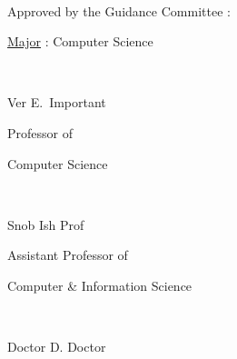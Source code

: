 \thispagestyle{plain}
\mbox{} \\
{\large
Approved by the Guidance Committee :

\vspace{.2 in}

\hspace{.2 in} \underline{Major} : Computer Science

\vspace{.2 in plus 1fill}

\hspace{3.2 in} \hrulefill\

\vspace{-.2 in}

\hspace{3.2 in} Ver E.\ Important
\vspace{-.1 in}

\hspace{3.2 in} Professor of

\vspace{-.2 in}

\hspace{3.2 in} Computer Science

\vspace{.2 in plus 1fill}




\hspace{3.2 in} \hrulefill\

\vspace{-.2 in}

\hspace{3.2 in} Snob Ish Prof
\vspace{-.1 in}

\hspace{3.2 in} Assistant Professor of

\vspace{-.2 in}

\hspace{3.2 in} Computer \& Information Science

\vspace{.2 in plus 1fill}

\hspace{3.2 in} \hrulefill\

\vspace{-.2 in}

\hspace{3.2 in} Doctor D. Doctor
\vspace{-.1 in}

}
